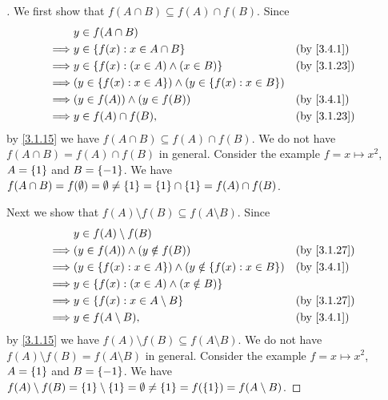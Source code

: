 \begin{proof}[]
  We first show that \(f(A \cap B) \subseteq f(A) \cap f(B)\).
  Since
  \begin{align*}
             & y \in f(A \cap B)                                                                      \\
    \implies & y \in \set{f(x) : x \in A \cap B}                                     &  & \by{3.4.1}  \\
    \implies & y \in \set{f(x) : (x \in A) \land (x \in B)}                          &  & \by{3.1.23} \\
    \implies & \pa{y \in \set{f(x) : x \in A}} \land \pa{y \in \set{f(x) : x \in B}}                  \\
    \implies & (y \in f(A)) \land (y \in f(B))                                       &  & \by{3.4.1}  \\
    \implies & y \in f(A) \cap f(B),                                                 &  & \by{3.1.23}
  \end{align*}
  by \cref{3.1.15} we have \(f(A \cap B) \subseteq f(A) \cap f(B)\).
  We do not have \(f(A \cap B) = f(A) \cap f(B)\) in general.
  Consider the example \(f = x \mapsto x^2\), \(A = \left\lbrace1\right\rbrace\) and \(B = \left\lbrace-1\right\rbrace\).
  We have \(f(A \cap B) = f(\emptyset) = \emptyset \neq \left\lbrace1\right\rbrace = \left\lbrace1\right\rbrace \cap \left\lbrace1\right\rbrace = f(A) \cap f(B)\).

  Next we show that \(f(A) \setminus f(B) \subseteq f(A \setminus B)\).
  Since
  \begin{align*}
             & y \in f(A) \setminus f(B)                                                                 \\
    \implies & (y \in f(A)) \land (y \notin f(B))                                       &  & \by{3.1.27} \\
    \implies & \pa{y \in \set{f(x) : x \in A}} \land \pa{y \notin \set{f(x) : x \in B}} &  & \by{3.4.1}  \\
    \implies & y \in \set{f(x) : (x \in A) \land (x \notin B)}                                           \\
    \implies & y \in \set{f(x) : x \in A \setminus B}                                   &  & \by{3.1.27} \\
    \implies & y \in f(A \setminus B),                                                  &  & \by{3.4.1}
  \end{align*}
  by \cref{3.1.15} we have \(f(A) \setminus f(B) \subseteq f(A \setminus B)\).
  We do not have \(f(A) \setminus f(B) = f(A \setminus B)\) in general.
  Consider the example \(f = x \mapsto x^2\), \(A = \left\lbrace1\right\rbrace\) and \(B = \left\lbrace-1\right\rbrace\).
  We have \(f(A) \setminus f(B) = \left\lbrace1\right\rbrace \setminus \left\lbrace1\right\rbrace = \emptyset \neq \left\lbrace1\right\rbrace = f(\left\lbrace1\right\rbrace) = f(A \setminus B)\).


\end{proof}
